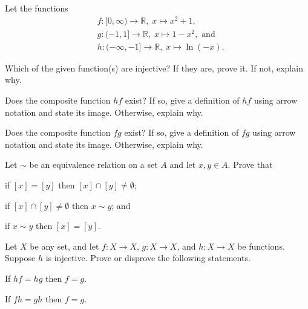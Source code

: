 \begin{problem}
    Let the functions
    \begin{align*}
        &f: [0, \infty) \to \mathbb{R},\; x\mapsto x^2+1,\\
        &g: (-1, 1] \to \mathbb{R},\; x\mapsto 1-x^2, \text{ and}\\
        &h: (-\infty, -1] \to \mathbb{R},\; x\mapsto \ln(-x).
    \end{align*}
    \begin{partquestions}{\alph*}
        \item Which of the given function(s) are injective? If they are, prove it. If not, explain why.
        \item Does the composite function $hf$ exist? If so, give a definition of $hf$ using arrow notation and state its image. Otherwise, explain why.
        \item Does the composite function $fg$ exist? If so, give a definition of $fg$ using arrow notation and state its image. Otherwise, explain why.
    \end{partquestions}
\end{problem}

\begin{problem}\label{problem-equivalence-class-equivalence}
    Let $\sim$ be an equivalence relation on a set $A$ and let $x, y \in A$. Prove that
    \begin{partquestions}{\alph*}
        \item if $[x] = [y]$ then $[x] \cap [y] \neq \emptyset$;
        \item if $[x] \cap [y] \neq \emptyset$ then $x \mathrel{\sim} y$; and
        \item if $x \mathrel{\sim} y$ then $[x] = [y]$.
    \end{partquestions}
\end{problem}

\begin{problem}
    Let $X$ be any set, and let $f: X \to X$, $g: X \to X$, and $h: X \to X$ be functions. Suppose $h$ is injective. Prove or disprove the following statements.
    \begin{partquestions}{\alph*}
        \item If $hf = hg$ then $f = g$.
        \item If $fh = gh$ then $f = g$.
    \end{partquestions}
\end{problem}

\newpage

